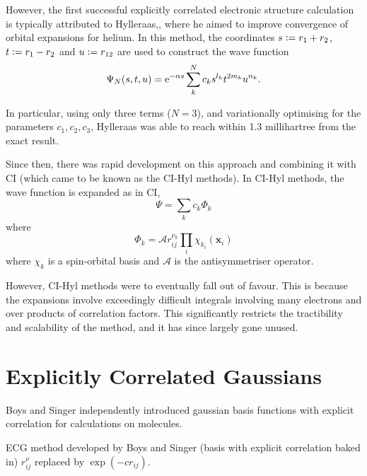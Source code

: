 However, the first successful explicitly correlated electronic structure calculation is typically attributed to Hylleraas,\cite{hattigExplicitly2012}, where he aimed to improve convergence of orbital expansions for helium.\cite{hylleraasUeber1928,hylleraasNeueBerechnungEnergie1929} In this method, the coordinates $s\mathrel{\mathop:}= r_1+r_2$, $t\mathrel{\mathop:}= r_1 - r_2$ and $u\mathrel{\mathop:}= r_{12}$ are used to construct the wave function
\begin{equation}
    \Psi_N(s,t,u) = \mathrm{e}^{-\alpha s}\sum_{k}^N c_ks^{l_k}t^{2m_k}u^{n_k}.
\end{equation}

In particular, using only three terms ($N=3$), and variationally optimising for the parameters $c_1,c_2,c_3$, Hylleraas was able to reach within 1.3 millihartree from the exact result.

Since then, there was rapid development on this approach and combining it with \gls{CI} (which came to be known as the CI-Hyl methods).
\cite{largo-cabrerizoHylleraasCI1987,jamesGround1933,kolosAccurate1964,perkinsAtomic1968,perkinsAtomic1969,simsCombined1971,simsOneCenter1971,claryHylleraastype1977,claryCIHylleraas1976} In CI-Hyl methods, the wave function is expanded as in \gls{CI},
\begin{equation}
    \Psi = \sum_k c_k \Phi_k
\end{equation}
where
\begin{equation}
    \Phi_k = \mathcal{A} r^{\nu_k}_{ij}\prod_i\chi_{k_i}(\bm x_i)
\end{equation}
where ${\chi_k}$ is a spin-orbital basis and $\mathcal{A}$ is the antisymmetriser operator.

However, CI-Hyl methods were to eventually fall out of favour. This is because the expansions involve exceedingly difficult integrals involving many electrons and over products of correlation factors. This significantly restricts the tractibility and scalability of the method, and it has since largely gone unused.

\section{Explicitly Correlated Gaussians}

Boys\cite{boysIntegral1960} and Singer\cite{singerUse1960} independently introduced gaussian basis functions with explicit correlation for calculations on molecules.

\gls{ECG} method developed by Boys and Singer\cite{boysIntegral1960,singerUse1960} (basis with explicit correlation baked in) $r_{ij}^\nu$ replaced by $\exp(-cr_{ij})$.

